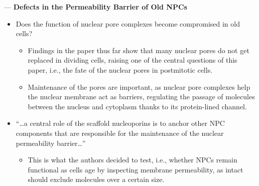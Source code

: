 \documentclass[basic,plain]{inVerba-notes}
\begin{document}
 --- \textbf{Defects in the Permeability Barrier of Old NPCs}
\begin{itemize}
  \item Does the function of nuclear pore complexes become compromised in old cells?
    \begin{itemize}
      \item Findings in the paper thus far show that many nuclear pores do not get replaced in dividing cells, raising one of the central questions of this paper, i.e., the fate of the nuclear pores in postmitotic cells.
      \item Maintenance of the pores are important, as nuclear pore complexes help the nuclear membrane act as barriers, regulating the passage of molecules between the nucleus and cytoplasm thanks to its protein-lined channel. 
    \end{itemize}
  \item ``\dots a central role of the scaffold nucleoporins is to anchor other NPC components that are responsible for the maintenance of the nuclear permeability barrier\dots''
    \begin{itemize}
      \item This is what the authors decided to test, i.e., whether NPCs remain functional as cells age by inspecting membrane permeability, as intact should exclude molecules over a certain size.
    \end{itemize}
\end{itemize}
\end{document}
